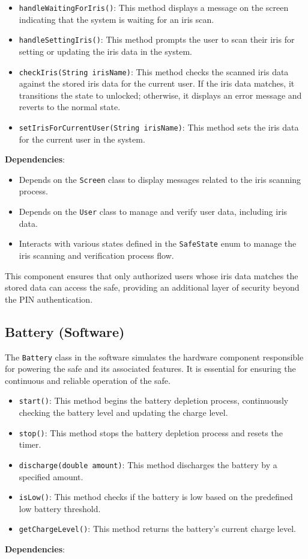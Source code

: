 \documentclass{article}
\begin{document}
\begin{itemize}
    \item \texttt{handleWaitingForIris()}: This method displays a message on the screen indicating that the system is waiting for an iris scan.
    \item \texttt{handleSettingIris()}: This method prompts the user to scan their iris for setting or updating the iris data in the system.
    \item \texttt{checkIris(String irisName)}: This method checks the scanned iris data against the stored iris data for the current user. If the iris data matches, it transitions the state to unlocked; otherwise, it displays an error message and reverts to the normal state.
    \item \texttt{setIrisForCurrentUser(String irisName)}: This method sets the iris data for the current user in the system.
\end{itemize}
\textbf{Dependencies}:
\begin{itemize}
    \item Depends on the \texttt{Screen} class to display messages related to the iris scanning process.
    \item Depends on the \texttt{User} class to manage and verify user data, including iris data.
    \item Interacts with various states defined in the \texttt{SafeState} enum to manage the iris scanning and verification process flow.
\end{itemize}
This component ensures that only authorized users whose iris data matches the stored data can access the safe, providing an additional layer of security beyond the PIN authentication.

\subsection{Battery (Software)}

The \texttt{Battery} class in the software simulates the hardware component responsible for powering the safe and its associated features. It is essential for ensuring the continuous and reliable operation of the safe.

\begin{itemize}
    \item \texttt{start()}: This method begins the battery depletion process, continuously checking the battery level and updating the charge level.
    \item \texttt{stop()}: This method stops the battery depletion process and resets the timer.
    \item \texttt{discharge(double amount)}: This method discharges the battery by a specified amount.
    \item \texttt{isLow()}: This method checks if the battery is low based on the predefined low battery threshold.
    \item \texttt{getChargeLevel()}: This method returns the battery's current charge level.
\end{itemize}
\textbf{Dependencies}:
\end{document}
